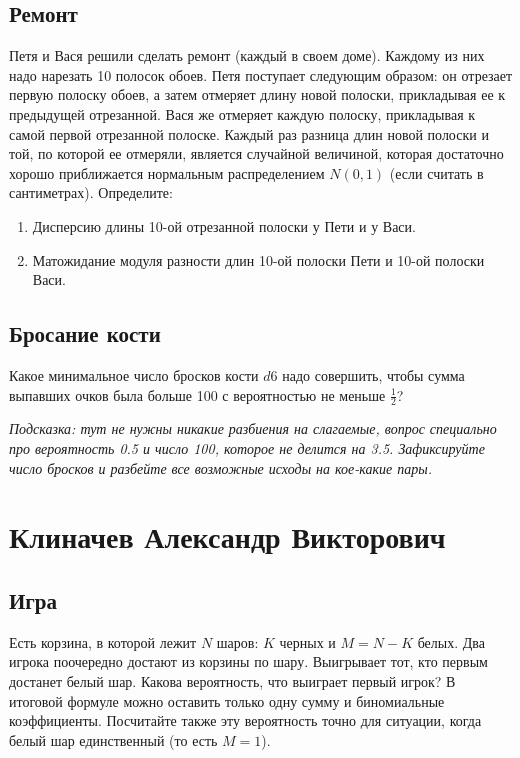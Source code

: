 \documentclass[12pt]{article}
\begin{document}
\subsection{Ремонт}
Петя и Вася решили сделать ремонт (каждый в своем доме). Каждому из них надо нарезать 10 полосок обоев. Петя поступает следующим образом: он отрезает первую полоску обоев, а затем отмеряет длину новой полоски, прикладывая ее к предыдущей отрезанной. Вася же отмеряет каждую полоску, прикладывая к самой первой отрезанной полоске. Каждый раз разница длин новой полоски и той, по которой ее отмеряли, является случайной величиной, которая достаточно хорошо приближается нормальным распределением $N(0, 1)$ (если считать в сантиметрах). Определите:
\begin{enumerate}
    \item Дисперсию длины 10-ой отрезанной полоски у Пети и у Васи.
    \item Матожидание модуля разности длин 10-ой полоски Пети и 10-ой полоски Васи. 
\end{enumerate}

\subsection{Бросание кости}
Какое минимальное число бросков кости $d6$ надо совершить, чтобы сумма выпавших очков была больше 100 с вероятностью не меньше $\frac{1}{2}$? 

\emph{Подсказка: тут не нужны никакие разбиения на слагаемые, вопрос специально про вероятность 0.5 и число 100, которое не делится на 3.5. Зафиксируйте число бросков и разбейте все возможные исходы на кое-какие пары.}

\newpage
\section{Клиначев Александр Викторович}

\subsection{Игра}
Есть корзина, в которой лежит $N$ шаров: $K$ черных и $M = N - K$ белых. Два игрока поочередно достают из корзины по шару. Выигрывает тот, кто первым достанет белый шар. Какова вероятность, что выиграет первый игрок? В итоговой формуле можно оставить только одну сумму и биномиальные коэффициенты. Посчитайте также эту вероятность точно для ситуации, когда белый шар единственный (то есть $M = 1$).
\end{document}
